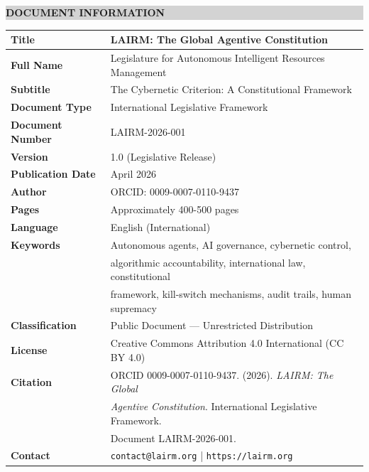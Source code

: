 \documentclass[12pt,a4paper,twoside,openright]{book}
\begin{document}
\thispagestyle{empty}
\vspace*{1.5cm}

\noindent\colorbox{lightgray}{%
    \parbox{\dimexpr\textwidth-2\fboxsep\relax}{%
        \vspace{12pt}
        \sffamily\normalsize
        \textbf{\textcolor{legislativeblue}{DOCUMENT INFORMATION}}
        \vspace{12pt}
    }%
}

\vspace{0.6cm}

\noindent\begin{tabularx}{\textwidth}{@{}lX@{}}
\toprule
\textbf{Title} & LAIRM: The Global Agentive Constitution \\
\midrule
\textbf{Full Name} & Legislature for Autonomous Intelligent Resources Management \\
\midrule
\textbf{Subtitle} & The Cybernetic Criterion: A Constitutional Framework \\
\midrule
\textbf{Document Type} & International Legislative Framework \\
\midrule
\textbf{Document Number} & LAIRM-2026-001 \\
\midrule
\textbf{Version} & 1.0 (Legislative Release) \\
\midrule
\textbf{Publication Date} & April 2026 \\
\midrule
\textbf{Author} & ORCID: 0009-0007-0110-9437 \\
\midrule
\textbf{Pages} & Approximately 400-500 pages \\
\midrule
\textbf{Language} & English (International) \\
\midrule
\textbf{Keywords} & Autonomous agents, AI governance, cybernetic control, \\
& algorithmic accountability, international law, constitutional \\
& framework, kill-switch mechanisms, audit trails, human supremacy \\
\midrule
\textbf{Classification} & Public Document — Unrestricted Distribution \\
\midrule
\textbf{License} & Creative Commons Attribution 4.0 International (CC BY 4.0) \\
\midrule
\textbf{Citation} & ORCID 0009-0007-0110-9437. (2026). \textit{LAIRM: The Global} \\
& \textit{Agentive Constitution}. International Legislative Framework. \\
& Document LAIRM-2026-001. \\
\midrule
\textbf{Contact} & \texttt{contact@lairm.org} | \texttt{https://lairm.org} \\
\bottomrule
\end{tabularx}
\end{document}
